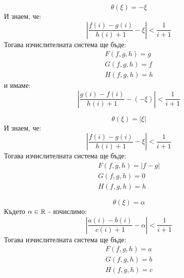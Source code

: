\begin{example}
    \begin{equation}
        \theta(\xi) = -\xi
    \end{equation}
    И знаем, че:
    \begin{equation}
        \left|\frac{f(i) - g(i)}{h(i) + 1} - \xi\right| < \frac{1}{i+1}
    \end{equation}
    Тогава изчислителната система ще бъде:
    \begin{equation}
        \begin{split}
            F(f, g, h) = g \\
            G(f, g, h) = f \\
            H(f, g, h) = h
        \end{split}
    \end{equation}
    и имаме:
    \begin{equation}
        \left|\frac{g(i) - f(i)}{h(i) + 1} - (-\xi)\right| < \frac{1}{i+1}
    \end{equation}
\end{example}

\begin{example}
    \begin{equation}
        \theta(\xi) = |\xi|
    \end{equation}
    И знаем, че:
    \begin{equation}
        \left|\frac{f(i) - g(i)}{h(i) + 1} - \xi\right| < \frac{1}{i+1}
    \end{equation}
    Тогава изчислителната система ще бъде:
    \begin{equation}
        \begin{split}
            F(f, g, h) = |f - g| \\
            G(f, g, h) = 0 \\
            H(f, g, h) = h
        \end{split}
    \end{equation}
\end{example}
\begin{example}
    \begin{equation}
        \theta(\xi) = \alpha
    \end{equation}
    Където $\alpha \in {\mathbb{R}}$ - изчислимо:
    \begin{equation}
        \left|\frac{a(i) - b(i)}{c(i) + 1}- \alpha\right| < \frac{1}{i+1}
    \end{equation}
    Тогава изчислителната система ще бъде:
    \begin{equation}
        \begin{split}
            F(f, g, h) = a \\
            G(f, g, h) = b \\
            H(f, g, h) = c
        \end{split}
    \end{equation}
\end{example}

